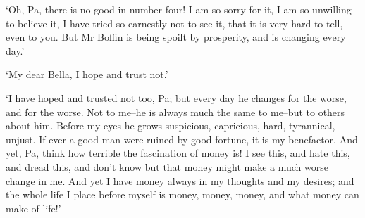‘Oh, Pa, there is no good in number four! I am so sorry for it, I am so
unwilling to believe it, I have tried so earnestly not to see it, that
it is very hard to tell, even to you. But Mr Boffin is being spoilt by
prosperity, and is changing every day.’

‘My dear Bella, I hope and trust not.’

‘I have hoped and trusted not too, Pa; but every day he changes for
the worse, and for the worse. Not to me--he is always much the same
to me--but to others about him. Before my eyes he grows suspicious,
capricious, hard, tyrannical, unjust. If ever a good man were ruined by
good fortune, it is my benefactor. And yet, Pa, think how terrible the
fascination of money is! I see this, and hate this, and dread this, and
don’t know but that money might make a much worse change in me. And yet
I have money always in my thoughts and my desires; and the whole life I
place before myself is money, money, money, and what money can make of
life!’




